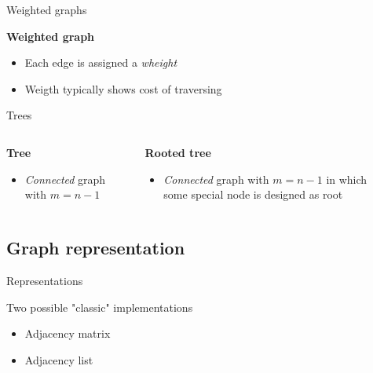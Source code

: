 \documentclass[compress]{beamer}
\begin{document}
\begin{frame}{Weighted graphs}
  \begin{block}{\textbf{Weighted graph}}
    \begin{itemize}
      \item Each edge is assigned a \emph{wheight}
      \item Weigth typically shows cost of traversing
    \end{itemize}
  \end{block}
  \begin{center}
  
  \end{center}
\end{frame}

\begin{frame}{Trees}
  \begin{columns}
    \begin{block}{\textbf{Tree}}
      \begin{itemize}
      \item \emph{Connected} graph with $m = n - 1$
      \end{itemize}
    \end{block}
    \begin{center}
    \scalebox{0.7}{}
    \end{center}
    \begin{block}{\textbf{Rooted tree}}
      \begin{itemize}
      \item \emph{Connected} graph with $m = n - 1$ in which some special node is designed as root
      \end{itemize}
    \end{block}
    \begin{center}
    \scalebox{0.8}{}
    \end{center}
  \end{columns}
\end{frame}

\subsection{Graph representation}

\begin{frame}{Representations}
  \begin{block}{}
    Two possible "classic" implementations
  \end{block}
  \begin{itemize}
    \item Adjacency matrix
    \item Adjacency list
  \end{itemize}
\end{frame}
\end{document}
